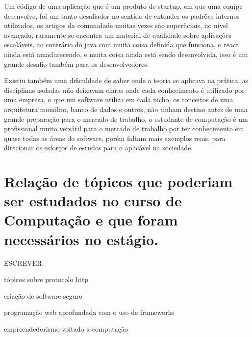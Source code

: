 \documentclass{ufersa}
\begin{document}
Um código de uma aplicação que é um produto de startup, em que uma equipe desenvolve, foi um tanto desafiador no sentido de entender os padrões internos utilizados, os artigos da comunidade muitas vezes são superficiais, no nível avançado, raramente se encontra um material de qualidade sobre aplicações escaláveis, ao contrário do java com muita coisa definida que funciona, o react ainda está amadurecendo, e muita coisa ainda está sendo desenvolvida, isso é um grande desafio também para os desenvolvedores.

Existiu também uma dificuldade de saber onde a teoria se aplicava na prática, as disciplinas isoladas não deixavam claras onde cada conhecimento é utilizado por uma empresa, o que um software utiliza em cada nicho, os conceitos de uma arquitetura monólito, banco de dados e outros, não tinham destino antes de uma grande preparação para o mercado de trabalho, o estudante de computação é um profissional muito versátil para o mercado de trabalho por ter conhecimento em quase todas as áreas do software, porém faltam mais exemplos reais, para direcionar os esforços de estudos para o aplicável na sociedade.   

\section{Relação de tópicos que poderiam ser estudados no curso de Computação e que foram necessários no estágio.}
ESCREVER.

tópicos sobre protocolo http

criação de software seguro

programação web aprofundada com o uso de frameworks

empreendedorismo voltado a computação
\end{document}
